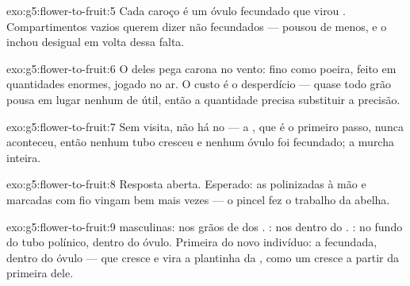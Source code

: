 \begin{solution}{exo:g5:flower-to-fruit:5}
Cada caroço é um óvulo fecundado que virou . Compartimentos
vazios querem dizer  não fecundados --- pousou  de menos,
e o  inchou desigual em volta dessa falta.
\end{solution}

\begin{solution}{exo:g5:flower-to-fruit:6}
O  deles pega carona no vento: fino como poeira, feito em
quantidades enormes, jogado no ar. O custo é o desperdício --- quase
todo grão pousa em lugar nenhum de útil, então a quantidade precisa
substituir a precisão.
\end{solution}

\begin{solution}{exo:g5:flower-to-fruit:7}
Sem visita, não há  no  --- a , que é o
primeiro passo, nunca aconteceu, então nenhum tubo cresceu e nenhum
óvulo foi fecundado; a  murcha inteira.
\end{solution}

\begin{solution}{exo:g5:flower-to-fruit:8}
Resposta aberta. Esperado: as  polinizadas à mão e marcadas com
fio vingam bem mais vezes --- o pincel fez o trabalho da abelha.
\end{solution}

\begin{solution}{exo:g5:flower-to-fruit:9}
 masculinas: nos grãos de  dos . : nos  dentro do . : no
fundo do tubo polínico, dentro do óvulo. Primeira  do novo
indivíduo: a  fecundada, dentro do óvulo
--- que cresce e vira a plantinha da , como um  cresce
a partir da primeira  dele.
\end{solution}

